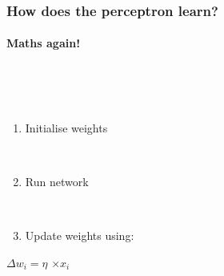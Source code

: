 \documentclass{beamer}
\begin{document}
\begin{frame}
\begin{columns}[T]
\begin{column}{.55\textwidth}
\begin{figure}
\begin{flushleft}
\end{flushleft}%
\end{figure}
    \end{column}
  \end{columns}
\end{frame}


\begin{frame}
\frametitle{How does the perceptron learn?}
\framesubtitle{Maths again!}
  \begin{columns}[T]
    \begin{column}{.5\textwidth} 
        \  \\
 \   \\ 
\begin{enumerate}
 \item Initialise weights
 
 \ \\
 \item Run network
 
 \ \\
 
 \item Update weights using:

\end{enumerate}
 
 \begin{center}
 $ \Delta w_i = \eta$   $\times x_{i}$
 \end{center} 
  \ \\
 

    \end{column}
    \begin{column}{.5\textwidth}
\begin{figure}
 

\end{figure}
\end{column}
\end{columns}
\end{frame}
\end{document}
